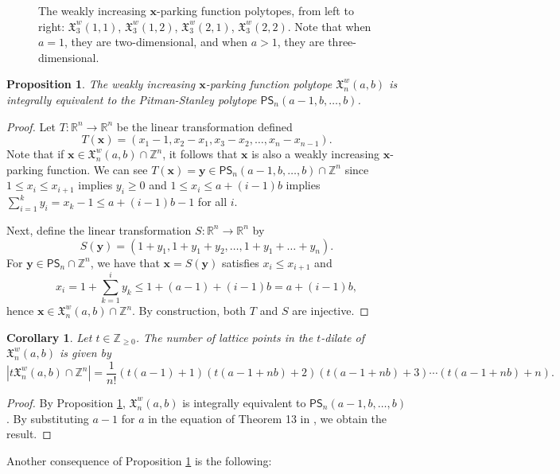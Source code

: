\documentclass[11pt]{amsart}
\newtheorem{proposition}[theorem]{Proposition}
\newtheorem{corollary}[theorem]{Corollary}
\theoremstyle{definition}
\newcommand{\0}{\emptyset}
\newcommand{\R}{\mathbb{R}}
\newcommand{\Z}{\mathbb{Z}}
\newcommand{\bx}{\mathbf{x}}
\newcommand{\X}{\mathfrak{X}}
\newcommand{\by}{\mathbf{y}}
\begin{document}
\begin{figure}[h]
    \caption{The weakly increasing $\mathbf{x}$-parking function polytopes, from left to right: $\mathfrak{X}_3^w(1,1)$,  $\mathfrak{X}_3^w(1,2)$,  $\mathfrak{X}_3^w(2,1)$,  $\mathfrak{X}_3^w(2,2)$. Note that when $a=1$, they are two-dimensional, and when $a>1$, they are three-dimensional.}
    \label{fig:weakly}
\end{figure}

\begin{proposition}\label{prop:integral_equivalence}
The weakly increasing $\mathbf{x}$-parking function polytope $\X^w_n(a,b)$ is integrally equivalent to the Pitman-Stanley polytope $\mathsf{PS}_n(a-1,b,\dots, b)$.
\end{proposition}

\begin{proof}
Let $T:\R^{n}\to\R^n$ be the linear transformation defined $$T(\bx)=(x_1 - 1, x_2-x_1,x_3-x_2,\dots, x_{n}-x_{n-1}). $$
Note that if $\bx\in \X_n^w(a,b)\cap \Z^{n}$, it follows that $\bx$ is also a weakly increasing $\mathbf{x}$-parking function.
We can see $T(\bx) = \by \in  \mathsf{PS}_n(a-1,b,\dots, b)\cap \Z^n$ since $1\leq x_i \leq x_{i+1}$ implies $y_i \geq 0$ and $1\leq x_i \leq a+(i-1)b$ implies $\sum_{i=1}^k y_i = x_k - 1\leq a+(i-1)b  -1$ for all $i$. 


Next, define the linear transformation $S:\R^n\to \R^{n}$ by \[S(\by)=(1+y_1,1+y_1+y_2,\dots, 1+y_1+\dots +y_n).\]
For $\by\in \mathsf{PS}_n\cap \Z^n$, we have that $\bx = S(\by)$ satisfies $x_i\leq x_{i+1}$  and $$x_i = 1 + \sum_{k=1}^i y_k \leq 1+ (a-1) + (i-1)b = a +(i-1)b,$$ 
hence $\bx\in \X^w_n(a,b)\cap \Z^{n}$.
By construction, both $T$ and $S$ are injective.
\end{proof}



\begin{corollary}
Let $t\in \Z_{\geq 0}$. 
The number of lattice points in the $t$-dilate of  $\X^w_n(a,b)$ is given by 
 $$|t\X^w_n(a,b)\cap \Z^n|=\frac{1}{n!}(t(a-1)+1)(t(a-1+nb)+2)(t(a-1+nb)+3)\cdots (t(a-1+nb)+n).$$
\end{corollary}

\begin{proof}
By Proposition \ref{prop:integral_equivalence}, $\X^w_n(a,b)$ is integrally equivalent to $\mathsf{PS}_n(a-1,b,\dots, b)$.
By substituting $a-1$ for $a$ in the equation of Theorem 13 in \cite{PitmanStanley}, we obtain the result. 
\end{proof}

Another consequence of Proposition \ref{prop:integral_equivalence} is the following:
\end{document}
